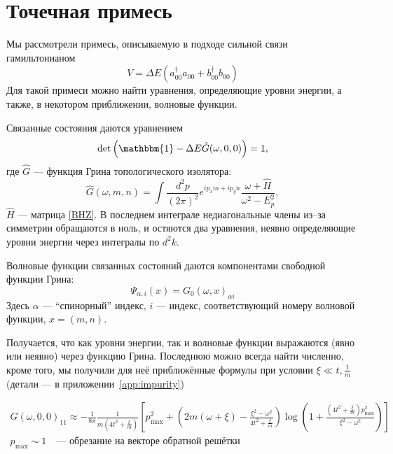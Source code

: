 \section{Точечная примесь}

Мы рассмотрели примесь, описываемую в подходе сильной связи гамильтонианом
\begin{equation}
    V = \Delta E (a_{00}^\dagger a_{00} + b_{00}^\dagger b_{00})
\end{equation}
Для такой примеси можно найти уравнения, определяющие уровни энергии, а также, в некотором 
приближении, волновые функции.

Связанные состояния даются уравнением
\begin{equation}    
    \label{imp_equation}
    \det{\left(\mathbbm{1} - \Delta E \hat{G}(\omega, 0, 0)\right)} = 1,
\end{equation}
где $\hat{G}$ --- функция Грина топологического изолятора:
\begin{equation}    
    \label{green_function}
    \hat{G}(\omega, m, n) = \int \frac{d^2 p}{(2\pi)^2} e^{ip_x m + ip_y n}
            \frac{\omega + \hat{H}}{\omega^2 - E_p^2},
\end{equation}
$\hat{H}$ --- матрица \eqref{BHZ}. 
В последнем интеграле недиагональные члены из--за симметрии обращаются в ноль, и 
остяются два уравнения, неявно определяющие уровни энергии через интегралы 
по $d^2k$.

Волновые функции связанных состояний даются компонентами свободной
функции Грина:
\begin{equation}
    \Psi_{\alpha, i}(x) = G_0(\omega, x)_{\alpha i}
\end{equation}
Здесь $\alpha$ --- ``спинорный'' индекс, $i$ --- индекс, соответствующий номеру волновой 
функции, $x = (m,n)$.

Получается, что как уровни энергии, так и волновые функции выражаются (явно или неявно) 
через функцию Грина. Последнюю можно всегда найти численно, кроме того, мы получили
для неё приближённые формулы при условии $\xi \ll t, \frac{1}{m}$
(детали --- в приложении~\ref{app:impurity})

\begin{multline}
    \label{approx_green_func}
    G(\omega,0,0)_{11} \approx -\frac{1}{8\pi}\frac{1}{m(4t^2 + \frac{\xi}{m})}
        \left[ p_{\mathrm{max}}^2 + 
            \left(2m(\omega+\xi) - \frac{\xi^2 - \omega^2}{4t^2 + \frac{\xi}{m}}\right) 
                \log{\left(1 + \frac{\left(4t^2 + \frac{\xi}{m}\right)p_{\mathrm{max}}^2}
                                    {\xi^2 - \omega^2}\right)}\right]\\
    p_{\mathrm{max}} \sim 1 \quad \text{--- обрезание на векторе обратной решётки}
\end{multline}

